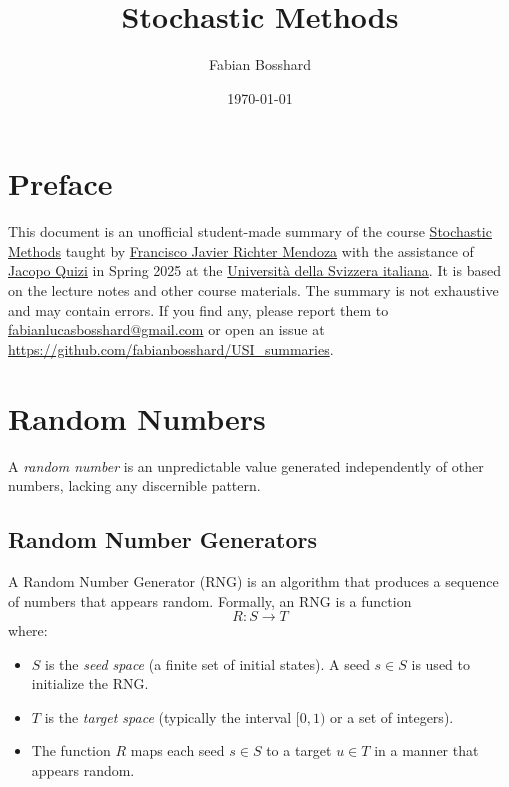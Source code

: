 \documentclass[10pt, headings=standardclasses, parskip=half, twoside]{scrartcl}
\title{Stochastic Methods}
\author{Fabian Bosshard}
\date{\today}
\begin{document}
\maketitle


\thispagestyle{empty}
\tableofcontents

\section*{Preface}

This document is an unofficial student-made summary of the course
\href{https://search.usi.ch/en/courses/35270722/stochastic-methods}{Stochastic Methods} taught by \href{https://search.usi.ch/en/people/fd79a01270bbee6228453cacbb95a6c5/richter-mendoza-francisco-javier}{Francisco Javier Richter Mendoza} with the assistance of \href{https://search.usi.ch/en/people/41cc6fa578d8e9a32c12472007ae5ee9/quizi-jacopo}{Jacopo Quizi} in Spring 2025 at the \href{https://www.usi.ch/en}{Università della Svizzera italiana}.
It is based on the lecture notes and other course materials.
The summary is not exhaustive and may contain errors.
If you find any, please report them to \href{mailto:fabianlucasbosshard@gmail.com}{fabianlucasbosshard@gmail.com} or open an issue at \url{https://github.com/fabianbosshard/USI_summaries}.

\doclicenseThis



\clearpage
{}
\section{Random Numbers}
A \textit{random number} is an unpredictable value generated independently of other numbers, lacking any discernible pattern.

\subsection{Random Number Generators}

\begin{definition}
    A Random Number Generator (RNG) is an algorithm that produces a sequence of numbers that appears random. Formally, an RNG is a function
    \[
    R: S \rightarrow T
    \]
    where:
    \begin{itemize}[before={\parskip=0pt}, nosep]
        \item $S$ is the \textit{seed space} (a finite set of initial states). A seed \(s \in S\) is used to initialize the RNG.
        \item $T$ is the \textit{target space} (typically the interval $[0,1)$ or a set of integers).
        \item The function $R$ maps each seed $s \in S$ to a target $u \in T$ in a manner that appears random. \qedhere
    \end{itemize}
\end{definition}
\end{document}
